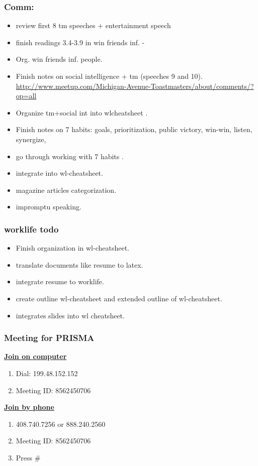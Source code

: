 \begin{frame}
\frametitle{Comm:}  
\begin{itemize}
\tiny \item \tiny review first 8 tm speeches + entertainment speech
\tiny \item \tiny finish readings 3.4-3.9  in win friends inf.  -  
\item \tiny Org. win friends inf. people. 
\item \tiny Finish notes on social intelligence + tm (speeches 9 and 10). \url{http://www.meetup.com/Michigan-Avenue-Toastmasters/about/comments/?op=all} 

\item \tiny Organize tm+social int into wlcheatsheet .  
\item \tiny Finish notes on 7 habits: goals, prioritization, 
public victory, win-win, listen, synergize,   
\item \tiny go through working with 7 habits . 
\item \tiny integrate into wl-cheatsheet.  
\item \tiny magazine articles categorization. 
\item \tiny impromptu speaking.
\end{itemize}
\end{frame} 
\begin{frame}
\frametitle{worklife todo} 
\begin{itemize} 
\item Finish organization in wl-cheatsheet. 
\item translate documents like resume to latex.  
\item integrate resume to worklife. 
\item create outline wl-cheatsheet  and extended outline of
  wl-cheatsheet. 
\item integrates slides into wl cheatsheet. 
\end{itemize}  
\end{frame}





\begin{frame} 

\frametitle{Meeting for PRISMA} 

\underline{\bf Join on computer} 

\begin{enumerate}
\small \item \small Dial: 199.48.152.152
\item \small Meeting ID: 8562450706
\end{enumerate}

\underline{\bf Join by phone} 
\begin{enumerate}
\small \item \small 408.740.7256 or 888.240.2560 
\item \small Meeting ID: 8562450706
\item \small Press \#
\end{enumerate}
\end{frame} 

